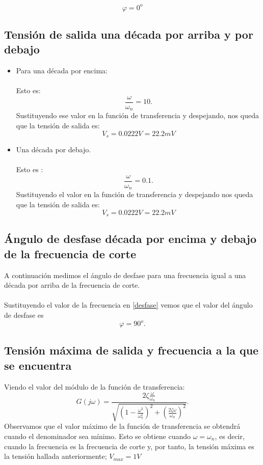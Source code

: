 \documentclass[11pt,letterpaper]{article}
\begin{document}
\begin{equation}
	\boxed{\varphi=0^o}
\end{equation}

\subsection{Tensión de salida una década por arriba y por debajo}
\begin{itemize}
	\item Para una década por encima:\\
\\
Esto es: 
\[
\frac{\omega}{\omega_n}=10
.\] 
Sustituyendo ese valor en la función de transferencia y despejando, nos queda que la tensión de salida es:
\begin{equation}
	\boxed{V_s=0.0222 V = 22.2 mV}
\end{equation}

\item Una década por debajo.\\
\\
Esto es :
\[
\frac{\omega}{\omega_n}=0.1
.\] 
Sustituyendo el valor en la función de transferencia y despejando nos queda que la tensión de salida es:
\begin{equation}
    \boxed{V_s=0.0222V = 22.2 mV}
\end{equation}
\end{itemize}
\subsection{Ángulo de desfase década por encima y debajo de la frecuencia de corte}
A continuación medimos el ángulo de desfase para una frecuencia igual a una década por arriba de la frecuencia de corte. \\
\\
Sustituyendo el valor de la frecuencia en \ref{desfase} vemos que el valor del ángulo de desfase es \[
    \varphi=90^o
.\] 
\subsection{Tensión máxima de salida y frecuencia a la que se encuentra}
Viendo el valor del módulo de la función de transferencia:
 \[
     G\left( j\omega \right) =\frac{2\zeta \frac{\omega}{\omega_n}}{\sqrt{\left( 1-\frac{\omega^2}{\omega_n^2} \right)^2+ \left( \frac{2\zeta \omega }{\omega_n} \right)^2  } }  
.\] 
Observamos que el valor máximo de la función de transferencia se obtendrá cuando el denominador sea mínimo. Esto se obtiene cuando $\omega=\omega_n$, es decir, cuando la frecuencia es la frecuencia de corte y, por tanto, la tensión máxima es la tensión hallada anteriormente; $V_{max}=1 V$
\end{document}
